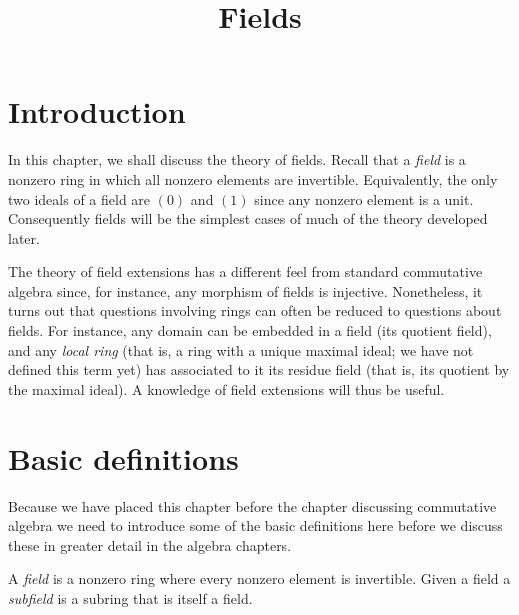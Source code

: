 

%


\title{Fields}


\maketitle

\label{section-phantom}

\tableofcontents


\section{Introduction}
\label{section-introduction}

\noindent
In this chapter, we shall discuss the theory of fields. Recall that a
{\it field} is a nonzero ring in which all nonzero elements are invertible.
Equivalently, the only two ideals of a field are $(0)$ and $(1)$
since any nonzero element is a unit. Consequently fields will be the
simplest cases of much of the theory developed later.

\medskip\noindent
The theory of field extensions has a different feel from standard commutative
algebra since, for instance, any morphism of fields is injective. Nonetheless,
it turns out that questions involving rings can often be reduced to questions
about fields. For instance, any domain can be embedded in a field
(its quotient field), and any {\it local ring} (that is, a ring with a unique
maximal ideal; we have not defined this term yet) has associated to it its
residue field (that is, its quotient by the maximal ideal).
A knowledge of field extensions will thus be useful.




\section{Basic definitions}
\label{section-definitions}

\noindent
Because we have placed this chapter before the chapter discussing
commutative algebra we need to introduce some of the basic definitions
here before we discuss these in greater detail in the algebra chapters.

\begin{definition}
\label{definition-field}
A {\it field} is a nonzero ring where every nonzero element is invertible.
Given a field a {\it subfield} is a subring that is itself a field.
\end{definition}

